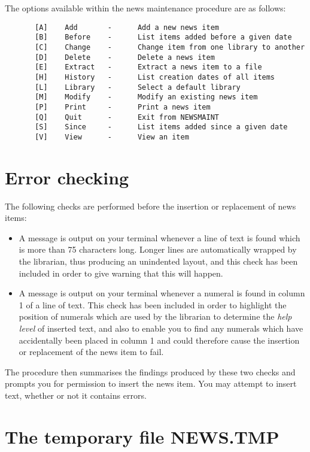 The options available within the news maintenance procedure are as follows:
\begin{verbatim}
       [A]    Add       -      Add a new news item
       [B]    Before    -      List items added before a given date
       [C]    Change    -      Change item from one library to another
       [D]    Delete    -      Delete a news item
       [E]    Extract   -      Extract a news item to a file
       [H]    History   -      List creation dates of all items
       [L]    Library   -      Select a default library
       [M]    Modify    -      Modify an existing news item
       [P]    Print     -      Print a news item
       [Q]    Quit      -      Exit from NEWSMAINT
       [S]    Since     -      List items added since a given date
       [V]    View      -      View an item
\end{verbatim}

\section {Error checking}

The following checks are performed before the insertion or replacement of news
items:
\begin{itemize}
\item A message is output on your terminal whenever a line of text is found
which is more than 75 characters long.
Longer lines are automatically wrapped by the librarian, thus producing an
unindented layout, and this check has been included in order to give warning
that this will happen.
\item A message is output on your terminal whenever a numeral is found in
column 1 of a line of text.
This check has been included in order to highlight the position of numerals
which are used by the librarian to determine the {\em help level} of inserted
text, and also to enable you to find any numerals which have accidentally been
placed in column 1 and could therefore cause the insertion or replacement of
the news item to fail.
\end{itemize}
The procedure then summarises the findings produced by these two checks and
prompts you for permission to insert the news item.
You may attempt to insert text, whether or not it contains errors.

\section{The temporary file NEWS.TMP}

